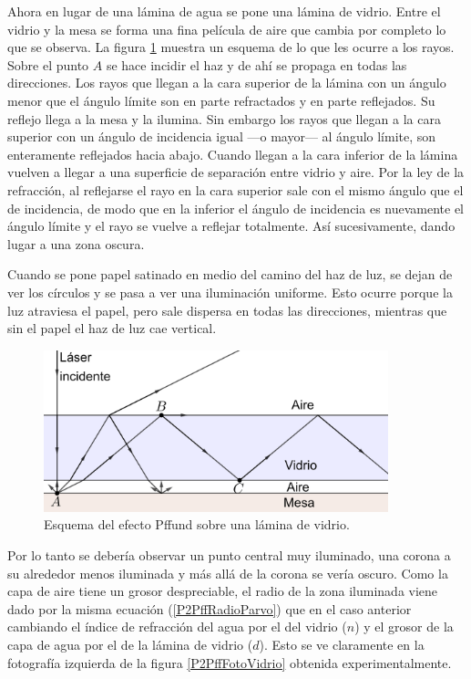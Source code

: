 \documentclass[12pt]{article}
\numberwithin{table}{section}
\numberwithin{figure}{section}
\numberwithin{equation}{section}
\begin{document}
Ahora en lugar de una lámina de agua se pone una lámina de vidrio. Entre el vidrio y la mesa se forma una fina película de aire que cambia por completo lo que se observa. La figura \ref{P2PffVidrio} muestra un esquema de lo que les ocurre a los rayos. Sobre el punto $A$ se hace incidir el haz y de ahí se propaga en todas las direcciones. Los rayos que llegan a la cara superior de la lámina con un ángulo menor que el ángulo límite son en parte refractados y en parte reflejados. Su reflejo llega a la mesa y la ilumina. Sin embargo los rayos que llegan a la cara superior con un ángulo de incidencia igual ---o mayor--- al ángulo límite, son enteramente reflejados hacia abajo. Cuando llegan a la cara inferior de la lámina vuelven a llegar a una superficie de separación entre vidrio y aire. Por la ley de la refracción, al reflejarse el rayo en la cara superior sale con el mismo ángulo que el de incidencia, de modo que en la inferior el ángulo de incidencia es nuevamente el ángulo límite y el rayo se vuelve a reflejar totalmente. Así sucesivamente, dando lugar a una zona oscura.

Cuando se pone papel satinado en medio del camino del haz de luz, se dejan de ver los círculos y se pasa a ver una iluminación uniforme. Esto ocurre porque la luz atraviesa el papel, pero sale dispersa en todas las direcciones, mientras que sin el papel el haz de luz cae vertical.

\begin{figure}[!ht]
\begin{center}
\includegraphics[width=10cm]{P2PffVidrio.png}
\caption{Esquema del efecto Pffund sobre una lámina de vidrio.}
\label{P2PffVidrio}
\end{center}
\end{figure}

Por lo tanto se debería observar un punto central muy iluminado, una corona a su alrededor menos iluminada y más allá de la corona se vería oscuro. Como la capa de aire tiene un grosor despreciable, el radio de la zona iluminada viene dado por la misma ecuación (\ref{P2PffRadioParvo}) que en el caso anterior cambiando el índice de refracción del agua por el del vidrio ($n$) y el grosor de la capa de agua por el de la lámina de vidrio ($d$). Esto se ve claramente en la fotografía izquierda de la figura \ref{P2PffFotoVidrio} obtenida experimentalmente.
\end{document}
